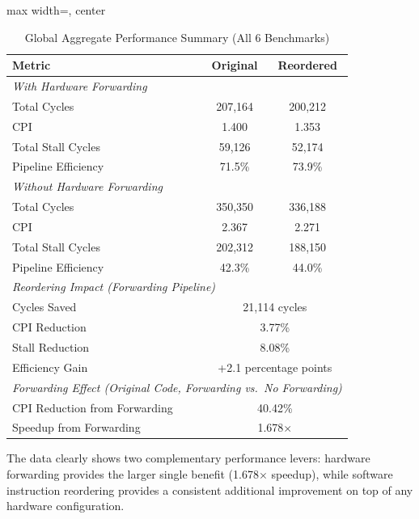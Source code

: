 \documentclass[11pt]{report}
\begin{document}
\begin{table}[H]
\centering
\caption{Global Aggregate Performance Summary (All 6 Benchmarks)}
\label{tab:global_summary}
\renewcommand{\arraystretch}{1.3}
\begin{adjustbox}{max width=\linewidth, center}
\footnotesize
\begin{tabular}{@{}lcc@{}}
\toprule
\textbf{Metric} & \textbf{Original} & \textbf{Reordered} \\
\midrule
\multicolumn{3}{l}{\textit{With Hardware Forwarding}} \\
\quad Total Cycles       & 207,164 & 200,212 \\
\quad CPI               & 1.400   & 1.353 \\
\quad Total Stall Cycles & 59,126  & 52,174 \\
\quad Pipeline Efficiency & 71.5\%  & 73.9\% \\
\midrule
\multicolumn{3}{l}{\textit{Without Hardware Forwarding}} \\
\quad Total Cycles       & 350,350 & 336,188 \\
\quad CPI               & 2.367   & 2.271 \\
\quad Total Stall Cycles & 202,312 & 188,150 \\
\quad Pipeline Efficiency & 42.3\%  & 44.0\% \\
\midrule
\multicolumn{3}{l}{\textit{Reordering Impact (Forwarding Pipeline)}} \\
\quad Cycles Saved       & \multicolumn{2}{c}{21,114 cycles} \\
\quad CPI Reduction      & \multicolumn{2}{c}{3.77\%} \\
\quad Stall Reduction    & \multicolumn{2}{c}{8.08\%} \\
\quad Efficiency Gain    & \multicolumn{2}{c}{+2.1 percentage points} \\
\midrule
\multicolumn{3}{l}{\textit{Forwarding Effect (Original Code, Forwarding vs.\ No Forwarding)}} \\
\quad CPI Reduction from Forwarding & \multicolumn{2}{c}{40.42\%} \\
\quad Speedup from Forwarding       & \multicolumn{2}{c}{1.678$\times$} \\
\bottomrule
\end{tabular}
\end{adjustbox}
\end{table}
\noindent The data clearly shows two complementary performance levers: hardware forwarding provides the larger single benefit (1.678$\times$ speedup), while software instruction reordering provides a consistent additional improvement on top of any hardware configuration.
\end{document}
